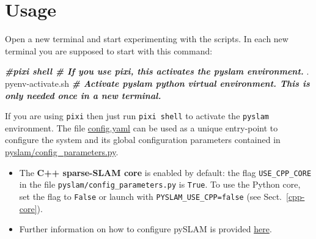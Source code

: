 \documentclass{article}
\newenvironment{Shaded}{\begin{snugshade}}{\end{snugshade}}
\newcommand{\BuiltInTok}[1]{\textcolor[rgb]{0.74,0.68,0.62}{#1}}
\newcommand{\CommentTok}[1]{\textcolor[rgb]{0.00,0.40,1.00}{\textbf{\textit{#1}}}}
\newcommand{\ExtensionTok}[1]{\textcolor[rgb]{0.74,0.68,0.62}{#1}}
\newcommand{\NormalTok}[1]{\textcolor[rgb]{0.74,0.68,0.62}{#1}}
\begin{document}
%







\clearpage
\appendix

\hypertarget{usage}{%
\section{Usage}\label{usage}}

Open a new terminal and start experimenting with the scripts. In each
new terminal you are supposed to start with this command:

\begin{scriptsize}
\begin{Shaded}
\begin{Highlighting}[]
\CommentTok{#pixi shell           # If you use pixi, this activates the pyslam environment. }
\NormalTok{ }\BuiltInTok{.} \ExtensionTok{pyenv-activate.sh}   \CommentTok{#  Activate pyslam python virtual environment. This is only needed once in a new terminal.}
\end{Highlighting}
\end{Shaded}
\end{scriptsize}

If you are using \texttt{pixi} then just run \texttt{pixi\ shell} to
activate the \texttt{pyslam} environment. The file \href{https://github.com/luigifreda/pyslam/blob/master/config.yaml}{config.yaml} can be used as a unique
entry-point to configure the system and its global configuration
parameters contained in
\href{https://github.com/luigifreda/pyslam/blob/master/pyslam/config_parameters.py}{pyslam/config\_parameters.py}. 
\begin{itemize}
\item The \textbf{C++ sparse-SLAM core} is enabled by default: the flag \texttt{USE\_CPP\_CORE} in the file \texttt{pyslam/config\_parameters.py} is \texttt{True}. To use the Python core, set the flag to \texttt{False} or launch with \texttt{PYSLAM\_USE\_CPP=false} (see Sect.~\ref{cpp-core}).
\item Further information on how to configure pySLAM is provided \protect\hyperlink{selecting-a-dataset-and-different-configuration-parameters}{here}.
\end{itemize}
\end{document}
